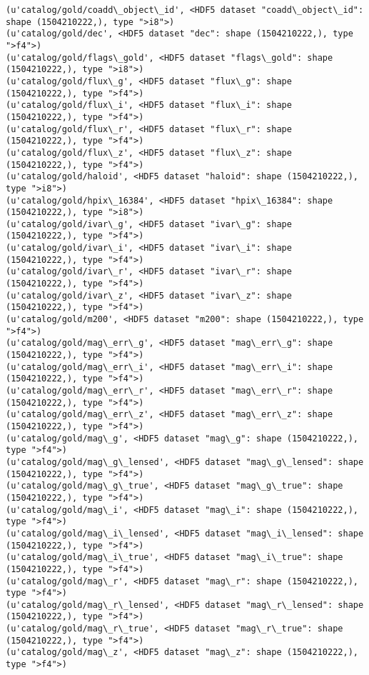 \documentclass[11pt]{article}
\begin{document}
    \begin{Verbatim}[commandchars=\\\{\}]
(u'catalog/gold/coadd\_object\_id', <HDF5 dataset "coadd\_object\_id": shape (1504210222,), type ">i8">)
(u'catalog/gold/dec', <HDF5 dataset "dec": shape (1504210222,), type ">f4">)
(u'catalog/gold/flags\_gold', <HDF5 dataset "flags\_gold": shape (1504210222,), type ">i8">)
(u'catalog/gold/flux\_g', <HDF5 dataset "flux\_g": shape (1504210222,), type ">f4">)
(u'catalog/gold/flux\_i', <HDF5 dataset "flux\_i": shape (1504210222,), type ">f4">)
(u'catalog/gold/flux\_r', <HDF5 dataset "flux\_r": shape (1504210222,), type ">f4">)
(u'catalog/gold/flux\_z', <HDF5 dataset "flux\_z": shape (1504210222,), type ">f4">)
(u'catalog/gold/haloid', <HDF5 dataset "haloid": shape (1504210222,), type ">i8">)
(u'catalog/gold/hpix\_16384', <HDF5 dataset "hpix\_16384": shape (1504210222,), type ">i8">)
(u'catalog/gold/ivar\_g', <HDF5 dataset "ivar\_g": shape (1504210222,), type ">f4">)
(u'catalog/gold/ivar\_i', <HDF5 dataset "ivar\_i": shape (1504210222,), type ">f4">)
(u'catalog/gold/ivar\_r', <HDF5 dataset "ivar\_r": shape (1504210222,), type ">f4">)
(u'catalog/gold/ivar\_z', <HDF5 dataset "ivar\_z": shape (1504210222,), type ">f4">)
(u'catalog/gold/m200', <HDF5 dataset "m200": shape (1504210222,), type ">f4">)
(u'catalog/gold/mag\_err\_g', <HDF5 dataset "mag\_err\_g": shape (1504210222,), type ">f4">)
(u'catalog/gold/mag\_err\_i', <HDF5 dataset "mag\_err\_i": shape (1504210222,), type ">f4">)
(u'catalog/gold/mag\_err\_r', <HDF5 dataset "mag\_err\_r": shape (1504210222,), type ">f4">)
(u'catalog/gold/mag\_err\_z', <HDF5 dataset "mag\_err\_z": shape (1504210222,), type ">f4">)
(u'catalog/gold/mag\_g', <HDF5 dataset "mag\_g": shape (1504210222,), type ">f4">)
(u'catalog/gold/mag\_g\_lensed', <HDF5 dataset "mag\_g\_lensed": shape (1504210222,), type ">f4">)
(u'catalog/gold/mag\_g\_true', <HDF5 dataset "mag\_g\_true": shape (1504210222,), type ">f4">)
(u'catalog/gold/mag\_i', <HDF5 dataset "mag\_i": shape (1504210222,), type ">f4">)
(u'catalog/gold/mag\_i\_lensed', <HDF5 dataset "mag\_i\_lensed": shape (1504210222,), type ">f4">)
(u'catalog/gold/mag\_i\_true', <HDF5 dataset "mag\_i\_true": shape (1504210222,), type ">f4">)
(u'catalog/gold/mag\_r', <HDF5 dataset "mag\_r": shape (1504210222,), type ">f4">)
(u'catalog/gold/mag\_r\_lensed', <HDF5 dataset "mag\_r\_lensed": shape (1504210222,), type ">f4">)
(u'catalog/gold/mag\_r\_true', <HDF5 dataset "mag\_r\_true": shape (1504210222,), type ">f4">)
(u'catalog/gold/mag\_z', <HDF5 dataset "mag\_z": shape (1504210222,), type ">f4">)

\end{Verbatim}
\end{document}
